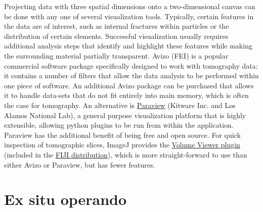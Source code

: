 \documentclass[journal=cmatex,manuscript=perspective]{achemso}
\begin{document}
Projecting data with three spatial dimensions onto a two-dimensional
canvas can be done with any one of several visualization
tools. Typically, certain features in the data are of interest, such
as internal fractures within particles or the distribution of certain
elements. Successful visualization usually requires additional
analysis steps that identify and highlight these features while making
the surrounding material partially transparent. Avizo (FEI) is a
popular commercial software package specifically designed to work with
tomography data: it contains a number of filters that allow the data
analysis to be performed within one piece of software. An additional
Avizo package can be purchased that allows it to handle data-sets that
do not fit entirely into main memory, which is often the case for
tomography. An alternative is
\href{http://www.paraview.org/}{Paraview} (Kitware Inc. and Los Alamos
National Lab), a general purpose visualization platform that is highly
extensible, allowing python plugins to be run from within the
application. Paraview has the additional benefit of being free and
open source. For quick inspection of tomographic slices, ImageJ
provides the
\href{https://imagej.nih.gov/ij/plugins/volume-viewer.html}{Volume
  Viewer plugin} (included in the \href{http://imagej.net/Fiji}{FIJI
  distribution}), which is more straight-forward to use than either
Avizo or Paraview, but has fewer features.

\section{Ex situ  operando}
\end{document}
